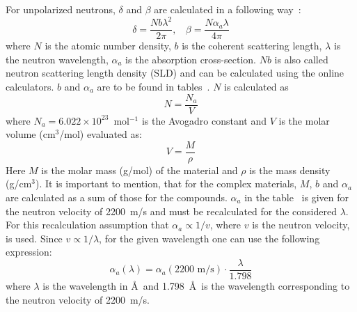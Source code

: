 For unpolarized neutrons, $\delta$ and $\beta$ are calculated in a following way~\cite{Mue13}:
\begin{equation}
\delta = \frac{Nb\lambda^2}{2\pi}, \:\:\:\: \beta = \frac{N\alpha_a\lambda}{4\pi}
\label{eq:deltabeta}
\end{equation}
where $N$ is the atomic number density, $b$ is the coherent scattering length, $\lambda$ is the neutron wavelength, $\alpha_a$ is the absorption cross-section. $Nb$ is also called neutron scattering length density (SLD) and can be calculated using the online calculators. $b$ and $\alpha_a$ are to be found in tables~\cite{Sea92online}. $N$ is calculated as
\begin{equation}
N = \frac{N_a}{V}
\end{equation}
where $N_a = 6.022\times 10^{23}$~mol$^{-1}$ is the Avogadro constant and $V$ is the molar volume (cm$^3$/mol) evaluated as:
\begin{equation}
V = \frac{M}{\rho}
\end{equation}
Here $M$ is the molar mass (g/mol) of the material and $\rho$ is the mass density (g/cm$^3$). It is important to mention, that for the complex materials, $M$, $b$ and $\alpha_a$ are calculated as a sum of those for the compounds. $\alpha_a$ in the table~\cite{Sea92online} is given for the neutron velocity of 2200~m/s and must be recalculated for the considered $\lambda$. For this recalculation assumption that $\alpha_a\propto 1/v$, where $v$ is the neutron velocity, is used. Since $v\propto 1/\lambda$, for the given wavelength one can use the following expression:
\begin{equation}
\alpha_a(\lambda) = \alpha_a (\text{2200 m/s})\cdot\frac{\lambda}{1.798}
\end{equation}
where $\lambda$ is the wavelength in \AA ~and 1.798~\AA ~is the wavelength corresponding to the neutron velocity of 2200~m/s.


